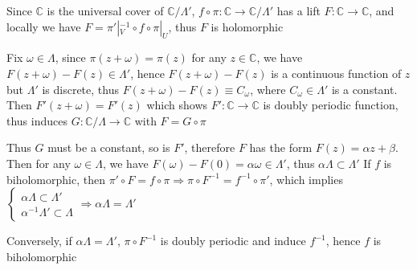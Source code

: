 \documentclass[../main.tex]{subfiles}
\begin{document}
\begin{problem}
Since $\mathbb{C}$ is the universal cover of \(\mathbb{C}/\Lambda'\), $f\circ\pi:\mathbb{C}\rightarrow \mathbb{C}/\Lambda'$ has a lift $F:\mathbb{C}\rightarrow \mathbb{C}$, and locally we have $F=\pi'|_{V}^{-1}\circ f\circ\pi|_{U}$, thus $F$ is holomorphic

\begin{center}
\end{center}

Fix \(\omega\in \Lambda\), since $\pi(z+\omega)=\pi(z)$ for any $z\in \mathbb{C}$, we have $F(z+\omega)-F(z)\in\Lambda'$, hence  \(F(z+\omega)-F(z)\) is a continuous function of $z$ but $\Lambda'$ is discrete, thus $F(z+\omega)-F(z)\equiv C_{\omega}$, where $C_{\omega}\in\Lambda'$ is a constant. Then $F'(z+\omega)=F'(z)$ which shows $F':\mathbb{C}\rightarrow \mathbb{C}$ is doubly periodic function, thus induces $G:\mathbb{C}/\Lambda\rightarrow \mathbb{C}$ with $F=G\circ\pi$

\begin{center}
\end{center}

Thus $G$ must be a constant, so is $F'$, therefore $F$ has the form $F(z)=\alpha z+\beta$. Then for any $\omega\in \Lambda$, we have $F(\omega)-F(0)=\alpha\omega\in\Lambda'$, thus $\alpha\Lambda\subset\Lambda'$
If $f$ is biholomorphic, then $\pi'\circ F=f\circ\pi\Rightarrow \pi\circ F^{-1}=f^{-1}\circ\pi'$, which implies $\left\{\begin{array}{rl}
\alpha\Lambda\subset\Lambda' \\
\alpha^{-1}\Lambda'\subset\Lambda
\end{array}\right. \Rightarrow \alpha\Lambda=\Lambda'$

\begin{center}
\end{center}

Conversely, if \(\alpha\Lambda=\Lambda'\), $\pi\circ F^{-1}$ is doubly periodic and induce $f^{-1}$, hence $f$ is biholomorphic
\end{problem}
\end{document}
